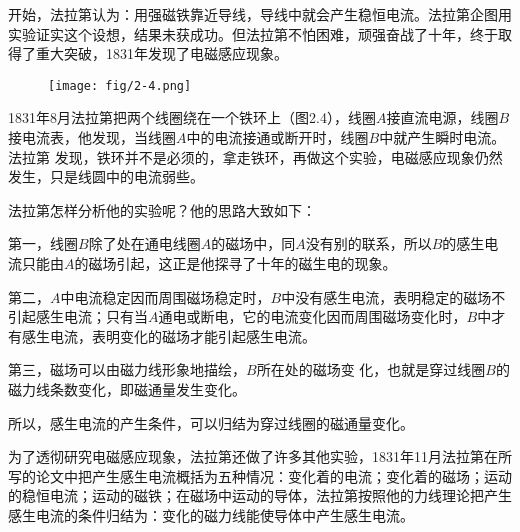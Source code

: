 开始，法拉第认为：用强磁铁靠近导线，导线中就会产生稳恒电流。法拉第企图用实验证实这个设想，结果未获成功。但法拉第不怕困难，顽强奋战了十年，终于取得了重大突破，1831年发现了电磁感应现象。
\begin{figure}[htp]\centering
\texttt{[image: fig/2-4.png]}
\caption{}
\end{figure}

1831年8月法拉第把两个线圈绕在一个铁环上（图2.4），线圈$A$接直流电源，线圈$B$接电流表，他发现，当线圈$A$中的电流接通或断开时，线圈$B$中就产生瞬时电流。法拉第
发现，铁环并不是必须的，拿走铁环，再做这个实验，电磁感应现象仍然发生，只是线圆中的电流弱些。

法拉第怎样分析他的实验呢？他的思路大致如下：

第一，线圈$B$除了处在通电线圈$A$的磁场中，同$A$没有别的联系，所以$B$的感生电流只能由$A$的磁场引起，这正是他探寻了十年的磁生电的现象。

第二，$A$中电流稳定因而周围磁场稳定时，$B$中没有感生电流，表明稳定的磁场不引起感生电流；只有当$A$通电或断电，它的电流变化因而周围磁场变化时，$B$中才有感生电流，表明变化的磁场才能引起感生电流。

第三，磁场可以由磁力线形象地描绘，$B$所在处的磁场变
化，也就是穿过线圈$B$的磁力线条数变化，即磁通量发生变化。

所以，感生电流的产生条件，可以归结为穿过线圈的磁通量变化。

为了透彻研究电磁感应现象，法拉第还做了许多其他实验，1831年11月法拉第在所写的论文中把产生感生电流概括为五种情况：变化着的电流；变化着的磁场；运动的稳恒电流；运动的磁铁；在磁场中运动的导体，法拉第按照他的力线理论把产生感生电流的条件归结为：变化的磁力线能使导体中产生感生电流。

